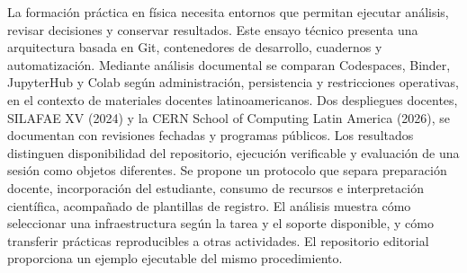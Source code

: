La formación práctica en física necesita entornos que permitan ejecutar análisis, revisar decisiones y conservar resultados. Este ensayo técnico presenta una arquitectura basada en Git, contenedores de desarrollo, cuadernos y automatización. Mediante análisis documental se comparan Codespaces, Binder, JupyterHub y Colab según administración, persistencia y restricciones operativas, en el contexto de materiales docentes latinoamericanos. Dos despliegues docentes, SILAFAE XV (2024) y la CERN School of Computing Latin America (2026), se documentan con revisiones fechadas y programas públicos. Los resultados distinguen disponibilidad del repositorio, ejecución verificable y evaluación de una sesión como objetos diferentes. Se propone un protocolo que separa preparación docente, incorporación del estudiante, consumo de recursos e interpretación científica, acompañado de plantillas de registro. El análisis muestra cómo seleccionar una infraestructura según la tarea y el soporte disponible, y cómo transferir prácticas reproducibles a otras actividades. El repositorio editorial proporciona un ejemplo ejecutable del mismo procedimiento.
